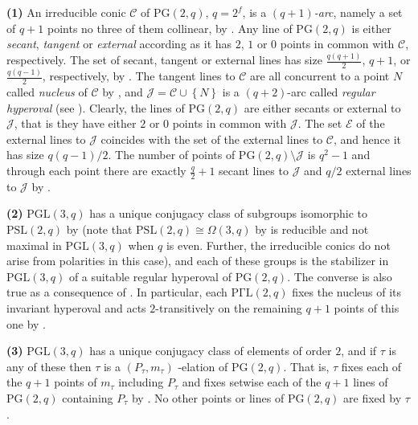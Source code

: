 \documentclass[a4paper,twopage,reqno,12pt]{amsart}
\theoremstyle{definition}
\numberwithin{equation}{section}
\newcommand{\PSL}{\mathrm{PSL}}
\newcommand{\PGL}{\mathrm{PGL}}
\newcommand{\PGaL}{\mathrm{P\Gamma L}}
\newcommand{\PG}{\mathrm{PG}}
\begin{document}
\noindent \textbf{(1)} An irreducible conic $\mathcal{C}$ of $\PG(2,q)$, $q=2^{f}$, is a $%
(q+1)$\emph{-arc}, namely a set of $q+1$ points no three of them collinear, by 
\cite[Lemma 7.7]{Hir}. Any line of $\PG(2,q)$ is either \emph{secant}, \emph{%
tangent} or \emph{external} according as it has $2$, $1$ or $0$ points in
common with $\mathcal{C}$, respectively. The set of secant, tangent or external lines has size $\frac{q(q+1)}{2}$, $q+1$, or $\frac{q(q-1)}{2}$, respectively, by \cite[Corollary 8.2]{Hir}. The tangent lines to $\mathcal{C}$
are all concurrent to a point $N$ called \emph{nucleus} of $\mathcal{C}$ by 
\cite[Corollary 7.11]{Hir}, and $\mathcal{J}=\mathcal{C}\cup \left\{
N\right\} $ is a $(q+2)$-arc called \emph{regular} \emph{hyperoval }(see \cite[%
Section 8.4]{Hir}). Clearly, the lines of $\PG(2,q)$ are either secants or external to $\mathcal{J}$, that is they have either $2$ or $0$ points in common with $%
\mathcal{J}$. The set $\mathcal{E}$ of the external lines to $\mathcal{J}$ coincides with the set of the external lines to $\mathcal{C}$, and hence it has size $q(q-1)/2$. The number of
points of $\PG(2,q)\setminus \mathcal{J}$ is $q^{2}-1$ and through each point
there are exactly $\frac{q}{2}+1$ secant lines to $\mathcal{J}$ and $q/2$ external lines to $\mathcal{J}$ by \cite[Corollary 8.8]{Hir}.

\noindent \textbf{(2)} $\PGL(3,q)$ has a unique conjugacy class of subgroups isomorphic
to $\PSL(2,q)$ by \cite[Table 8.3]{BHRD} (note that $\PSL(2,q) \cong \Omega (3,q)$ by \cite[Corollary 7.14]{Hir} is reducible
and not maximal in $\PGL(3,q)$ when $q$ is even. Further, the irreducible conics do not arise from
polarities in this case), and each of these groups is the stabilizer in $%
\PGL(3,q)$ of a suitable regular hyperoval of $\PG(2,q)$. The converse is also
true as a consequence of \cite[Theorem 7.4]{Hir}. In particular, each $\PGaL(2,q)$ fixes the nucleus of its invariant hyperoval and acts $2$-transitively on the remaining $q+1$ points of this one  by \cite[Corollary 7.15]{Hir}. 

\noindent \textbf{(3)} $\PGL(3,q)$ has a unique conjugacy class of elements of order $2$, and if $%
\tau $ is any of these then $\tau $ is a $(P_{\tau },m_{\tau })$%
-elation of $\PG(2,q)$. That is, $\tau $ fixes each of the $q+1$ points of $%
m_{\tau }$ including $P_{\tau }$ and fixes setwise each of the $q+1$ lines
of $\PG(2,q)$ containing $P_{\tau }$ by \cite[Exercise IV.4.6]{HP}. No
other points or lines of $\PG(2,q)$ are fixed by $\tau $.
\end{document}
